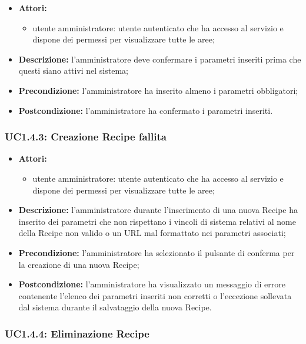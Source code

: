 \begin{itemize}
	\item \textbf{Attori:}
	\begin{itemize}
		\item utente amministratore: utente autenticato che ha accesso al servizio e dispone dei permessi per visualizzare tutte le aree;
	\end{itemize}
	\item \textbf{Descrizione:} l'amministratore deve confermare i parametri inseriti prima che questi siano attivi nel sistema;
	\item \textbf{Precondizione:} l'amministratore ha inserito almeno i parametri obbligatori;
	\item \textbf{Postcondizione:} l'amministratore ha confermato i parametri inseriti.
\end{itemize}

\subsubsection{UC1.4.3: Creazione Recipe fallita}

\begin{itemize}
	\item \textbf{Attori:}
	\begin{itemize}
		\item utente amministratore: utente autenticato che ha accesso al servizio e dispone dei permessi per visualizzare tutte le aree;
	\end{itemize}
	\item \textbf{Descrizione:} l'amministratore durante l'inserimento di una nuova Recipe ha inserito dei parametri che non rispettano i vincoli di sistema relativi al nome della Recipe non valido o un URL mal formattato nei parametri associati;
	\item \textbf{Precondizione:} l'amministratore ha selezionato il pulsante di conferma per la creazione di una nuova Recipe;
	\item \textbf{Postcondizione:} l'amministratore ha visualizzato un messaggio di errore contenente l'elenco dei parametri inseriti non corretti o l'eccezione sollevata dal sistema durante il salvataggio della nuova Recipe.
\end{itemize}

\subsubsection{UC1.4.4: Eliminazione Recipe}

